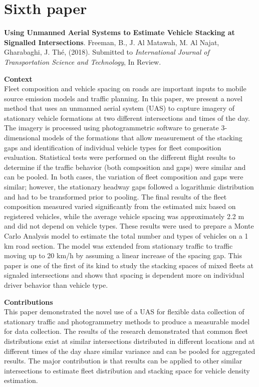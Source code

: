 \section{Sixth paper}
\noindent
\textbf{Using Unmanned Aerial Systems to Estimate Vehicle Stacking at Signalled Intersections}.  Freeman,  B., J. Al Matawah, M. Al Najat, Gharabaghi, J.  Th\'e, (2018). Submitted to \textit{International Journal of Transportation Science and Technology}, In Review.

\vspace{5mm}
\noindent
\textbf{Context}\\
\noindent
Fleet composition and vehicle spacing on roads are important inputs to mobile source emission models and traffic planning. In this paper, we present a novel method that uses an unmanned aerial system (UAS) to capture imagery of stationary vehicle formations at two different intersections and times of the day. The imagery is processed using photogrammetric software to generate 3-dimensional models of the formations that allow measurement of the stacking gaps and identification of individual vehicle types for fleet composition evaluation. Statistical tests were performed on the different flight results to determine if the traffic behavior (both composition and gaps) were similar and can be pooled. In both cases, the variation of fleet composition and gaps were similar; however, the stationary headway gaps followed a logarithmic distribution and had to be transformed prior to pooling. The final results of the fleet composition measured varied significantly from the estimated mix based on registered vehicles, while the average vehicle spacing was approximately 2.2 m and did not depend on vehicle types. These results were used to prepare a Monte Carlo Analysis model to estimate the total number and types of vehicles on a 1 km road section. The model was extended from stationary traffic to traffic moving up to 20 km/h by assuming a linear increase of the spacing gap. This paper is one of the first of its kind to study the stacking spaces of mixed fleets at signaled intersections and shows that spacing is dependent more on individual driver behavior than vehicle type.

\vspace{5mm}
\noindent
\textbf{Contributions}\\
\noindent
This paper demonstrated the novel use of a UAS for flexible data collection of stationary traffic and photogrammetry methods to produce a measurable model for data collection. The results of the research demonstrated that common fleet distributions exist at similar intersections distributed in different locations and at different times of the day share similar variance and can be pooled for aggregated results. The major contribution is that results can be applied to other similar intersections to estimate fleet distribution and stacking space for vehicle density estimation.

\clearpage